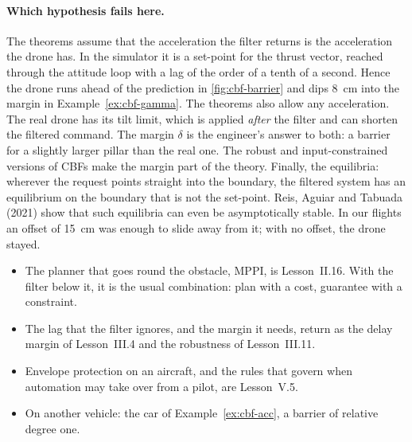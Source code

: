 \paragraph{Which hypothesis fails here.} The theorems assume that the acceleration the filter returns is the acceleration the drone has. In the simulator it is a set-point for the thrust vector, reached through the attitude loop with a lag of the order of a tenth of a second. Hence the drone runs ahead of the prediction in \cref{fig:cbf-barrier} and dips \SI{8}{cm} into the margin in Example~\ref{ex:cbf-gamma}. The theorems also allow any acceleration. The real drone has its tilt limit, which is applied \emph{after} the filter and can shorten the filtered command. The margin $\delta$ is the engineer's answer to both: a barrier for a slightly larger pillar than the real one. The robust and input-constrained versions of CBFs make the margin part of the theory. Finally, the equilibria: wherever the request points straight into the boundary, the filtered system has an equilibrium on the boundary that is not the set-point. Reis, Aguiar and Tabuada (2021) show that such equilibria can even be asymptotically stable. In our flights an offset of \SI{15}{cm} was enough to slide away from it; with no offset, the drone stayed.

\begin{lookahead}
\begin{itemize}[leftmargin=1.2em]
  \item The planner that goes round the obstacle, MPPI, is Lesson~II.16. With the filter below it, it is the usual combination: plan with a cost, guarantee with a constraint.
  \item The lag that the filter ignores, and the margin it needs, return as the delay margin of Lesson~III.4 and the robustness of Lesson~III.11.
  \item Envelope protection on an aircraft, and the rules that govern when automation may take over from a pilot, are Lesson~V.5.
  \item On another vehicle: the car of Example~\ref{ex:cbf-acc}, a barrier of relative degree one.
\end{itemize}
\end{lookahead}

